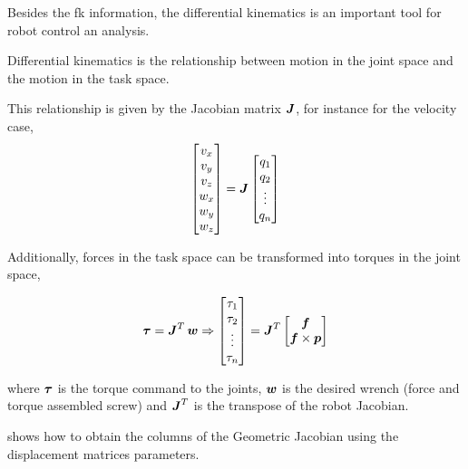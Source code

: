 Besides the \ac{fk} information, the differential kinematics is an important tool for robot control an analysis.
\begin{definition}
Differential kinematics is the relationship between motion in the joint space and the motion in the task space.
\end{definition}

This relationship is given by the Jacobian matrix $\boldsymbol{J}$, for instance for the velocity case,
\begin{equation}
  \begin{bmatrix} v_x \\ v_y \\ v_z \\ w_x \\ w_y \\ w_z\end{bmatrix} =
  \boldsymbol{J}
  \begin{bmatrix} q_1 \\ q_2 \\ \vdots \\ q_n\end{bmatrix}
\end{equation}

Additionally, forces in the task space can be transformed into torques in the joint space,

\begin{equation}
  \boldsymbol{\tau} = \boldsymbol{J}^T\,\boldsymbol{w} \Rightarrow
  \begin{bmatrix} \tau_1 \\ \tau_2 \\ \vdots \\ \tau_n\end{bmatrix} = 
  \boldsymbol{J}^T
  \begin{bmatrix} \boldsymbol{f} \\ \boldsymbol{f}\times\boldsymbol{p} \end{bmatrix}
\end{equation}

where $\boldsymbol{\tau}$ is the torque command to the joints, $\boldsymbol{w}$ is the desired wrench (force and torque assembled screw) and $\boldsymbol{J}^T$ is the transpose of the robot Jacobian.

 shows how to obtain the columns of the Geometric Jacobian using the displacement matrices parameters.
